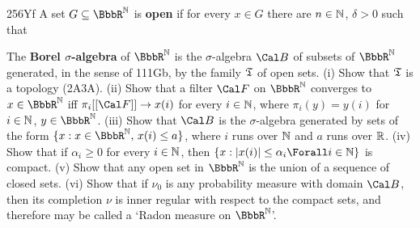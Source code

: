 {\spheader 256Yf A set
$G\subseteq\BbbR^{\Bbb N}$ is {\bf open} if for every $x\in G$ there are
$n\in\Bbb N$, $\delta>0$ such that


\noindent The {\bf Borel $\sigma$-algebra} of $\BbbR^{\Bbb N}$ is the
$\sigma$-algebra $\Cal B$ of subsets of
$\BbbR^{\Bbb N}$ generated, in the sense of 111Gb, by the family
$\frak T$ of open sets.   (i) Show that $\frak T$ is a topology (2A3A).
(ii) Show that a filter $\Cal F$ on $\BbbR^{\Bbb N}$ converges to
$x\in\BbbR^{\Bbb N}$ iff $\pi_i[[\Cal F]]\to x(i)$ for every
$i\in\Bbb N$, where
$\pi_i(y)=y(i)$ for $i\in\Bbb N$, $y\in\BbbR^{\Bbb N}$.   (iii)
Show that $\Cal B$ is the $\sigma$-algebra generated by sets of the form
$\{x:x\in \BbbR^{\Bbb N},\,x(i)\le a\}$,
where $i$ runs over $\Bbb N$ and $a$ runs over $\Bbb R$.
(iv) Show that if $\alpha_i\ge 0$ for every $i\in\Bbb N$, then
$\{x:|x(i)|\le\alpha_i\Forall i\in\Bbb N\}$ is compact.
(v) Show that any open set in $\BbbR^{\Bbb N}$ is the union of a
sequence of closed sets.      (vi) Show that if $\nu_0$ is any probability  measure with domain
$\Cal B$, then its completion $\nu$ is inner regular with respect to the
compact sets, and therefore may be called a `Radon measure on
$\BbbR^{\Bbb N}$'.   
}%



